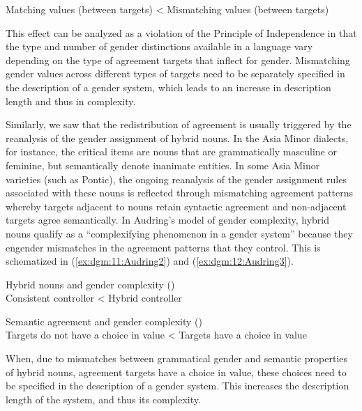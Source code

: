 \documentclass[output=collectionpaper]{langsci/langscibook}
\begin{document}
\vspace{3mm}
Matching values (between targets) {\textless} Mismatching values (between targets)

\z

This effect can be analyzed as a violation of the Principle of Independence in that the type and number of gender distinctions available in a language vary depending on the type of agreement targets that inflect for gender.  Mismatching gender values across different types of targets need to be separately specified in the description of a gender system, which leads to an increase in description length and thus in complexity.

Similarly, we saw that the redistribution of agreement is usually triggered by the reanalysis of the gender assignment of hybrid nouns. In the Asia Minor  dialects, for instance, the critical items are nouns that are grammatically masculine or feminine, but semantically denote inanimate entities. In some Asia Minor  varieties (such as Pontic), the ongoing reanalysis of the gender assignment rules associated with these nouns is reflected through mismatching agreement patterns whereby targets adjacent to nouns retain syntactic agreement and non-adjacent targets agree semantically. In Audring's model of gender complexity, hybrid nouns qualify as a ``complexifying phenomenon in a gender system'' because they engender mismatches in the agreement patterns that they control. This is schematized in (\ref{ex:dgm:11:Audring2}) and (\ref{ex:dgm:12:Audring3}).

\ea\label{ex:dgm:11:Audring2}
Hybrid nouns and gender complexity (\citealt{Audring2017})\\

\vspace{3mm}
Consistent controller {\textless} Hybrid controller
\z

\ea\label{ex:dgm:12:Audring3}
Semantic agreement and gender complexity (\citealt{Audring2017})\\

\vspace{3mm}
Targets do not have a choice in value {\textless} Targets have a choice in value
\z

When, due to mismatches between grammatical gender and semantic properties of hybrid nouns, agreement targets have a choice in value, these choices need to be specified in the description of a gender system. This increases the description length of the system, and thus its complexity.
\end{document}
